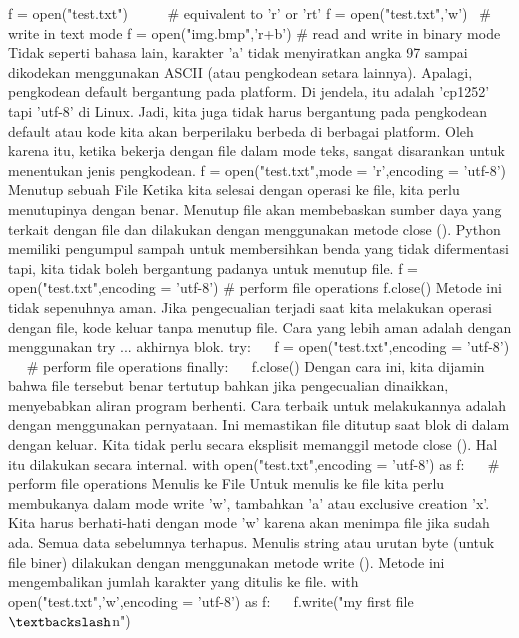 

\vspace{12pt}
\noindent 
f = open("test.txt")~~~~~  $  \#  $ equivalent to 'r' or 'rt'
f = open("test.txt",'w')~  $  \#  $ write in text mode 
f = open("img.bmp",'r+b')  $  \#  $ read and write in binary mode 
Tidak seperti bahasa lain, karakter 'a' tidak menyiratkan angka 97 sampai dikodekan menggunakan ASCII (atau pengkodean setara lainnya). 
Apalagi, pengkodean default bergantung pada platform. Di jendela, itu adalah 'cp1252' tapi 'utf-8' di Linux. 
Jadi, kita juga tidak harus bergantung pada pengkodean default atau kode kita akan berperilaku berbeda di berbagai platform. 
Oleh karena itu, ketika bekerja dengan file dalam mode teks, sangat disarankan untuk menentukan jenis pengkodean.
f = open("test.txt",mode = 'r',encoding = 'utf-8') 
Menutup sebuah File 
Ketika kita selesai dengan operasi ke file, kita perlu menutupinya dengan benar. 
Menutup file akan membebaskan sumber daya yang terkait dengan file dan dilakukan dengan menggunakan metode close (). 
Python memiliki pengumpul sampah untuk membersihkan benda yang tidak difermentasi tapi, kita tidak boleh bergantung padanya untuk menutup file. 
f = open("test.txt",encoding = 'utf-8') 
 $  \#  $ perform file operations
f.close() 
Metode ini tidak sepenuhnya aman. Jika pengecualian terjadi saat kita melakukan operasi dengan file, kode keluar tanpa menutup file. 
Cara yang lebih aman adalah dengan menggunakan try ... akhirnya blok. 
try:
~~ f = open("test.txt",encoding = 'utf-8')
~~  $  \#  $ perform file operations 
finally: 
~~ f.close() 
Dengan cara ini, kita dijamin bahwa file tersebut benar tertutup bahkan jika pengecualian dinaikkan, menyebabkan aliran program berhenti. 
Cara terbaik untuk melakukannya adalah dengan menggunakan pernyataan. Ini memastikan file ditutup saat blok di dalam dengan keluar. 
Kita tidak perlu secara eksplisit memanggil metode close (). Hal itu dilakukan secara internal.
with open("test.txt",encoding = 'utf-8') as f:
~~  $  \#  $ perform file operations
Menulis ke File 
Untuk menulis ke file kita perlu membukanya dalam mode write 'w', tambahkan 'a' atau exclusive creation 'x'. 
Kita harus berhati-hati dengan mode 'w' karena akan menimpa file jika sudah ada. Semua data sebelumnya terhapus. 
Menulis string atau urutan byte (untuk file biner) dilakukan dengan menggunakan metode write (). Metode ini mengembalikan jumlah karakter yang ditulis ke file. 
with open("test.txt",'w',encoding = 'utf-8') as f: 
~~ f.write("my first file $  \textbackslash  $n") 
